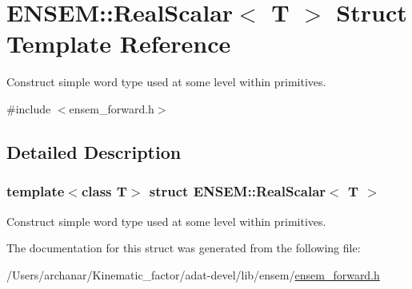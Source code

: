 \hypertarget{structENSEM_1_1RealScalar}{}\section{E\+N\+S\+EM\+:\+:Real\+Scalar$<$ T $>$ Struct Template Reference}
\label{structENSEM_1_1RealScalar}


Construct simple word type used at some level within primitives.  




{\ttfamily \#include $<$ensem\+\_\+forward.\+h$>$}



\subsection{Detailed Description}
\subsubsection*{template$<$class T$>$\newline
struct E\+N\+S\+E\+M\+::\+Real\+Scalar$<$ T $>$}

Construct simple word type used at some level within primitives. 

The documentation for this struct was generated from the following file\+:\begin{DoxyCompactItemize}
\item 
/\+Users/archanar/\+Kinematic\+\_\+factor/adat-\/devel/lib/ensem/\mbox{\hyperlink{adat-devel_2lib_2ensem_2ensem__forward_8h}{ensem\+\_\+forward.\+h}}\end{DoxyCompactItemize}
